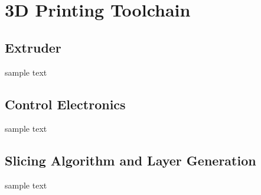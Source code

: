 \section{3D Printing Toolchain}

\subsection{Extruder}

\indent

sample text

\subsection{Control Electronics}

\indent

sample text

\subsection{Slicing Algorithm and Layer Generation}

\indent

sample text